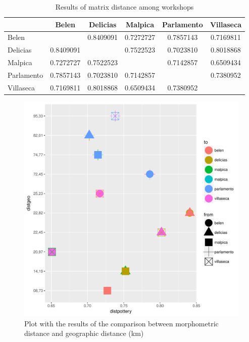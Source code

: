 \documentclass[review]{elsarticle}
\begin{document}
\begin{table}[htp]
\begin{tabular}{lccccc}
\hline
        & Belen   &   Delicias & Malpica & Parlamento & Villaseca\\ \hline
Belen   &         &   0.8409091&0.7272727&0.7857143   &0.7169811  \\
Delicias&0.8409091&            &0.7522523&0.7023810   &0.8018868   \\
Malpica &0.7272727&0.7522523   &         &0.7142857   &0.6509434    \\
Parlamento&0.7857143&0.7023810&0.7142857&            &0.7380952     \\
Villaseca&0.7169811&0.8018868&0.6509434&0.7380952    &                \\
\hline

\end{tabular}
\caption{Results of matrix distance among workshops}
\label{table:spatialdistance}
\end{table}

\begin{figure}[htp]
	\centering
\includegraphics[scale=0.45]{spatgeo.pdf}
\caption{Plot with the results of the comparison between morphometric distance and geographic distance (km)}
\label{spatgeo}
\end{figure} 
\end{document}
